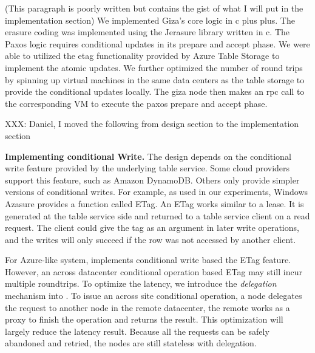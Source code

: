 (This paragraph is poorly written but contains the gist of what I will put in the implementation section)
We implemented Giza’s core logic in c plus plus. The erasure coding was implemented using the Jerasure library written in c. The Paxos logic requires conditional updates in its prepare and accept phase. We were able to utilized the etag functionality provided by Azure Table Storage to implement the atomic updates. We further optimized the number of round trips by spinning up virtual machines in the same data centers as the table storage to provide the conditional updates locally. The giza node then makes an rpc call to the corresponding VM to execute the paxos prepare and accept phase. 

{XXX: Daniel, I moved the following from design section to the implementation section}

{\bf Implementing conditional Write.}
The \name design depends on the conditional write feature provided by the
underlying table service. Some cloud providers support this feature, such as Amazon DynamoDB.
Others only provide simpler versions of conditional writes. For example, as used in our
experiments, Windows Azasure provides a function called ETag. An ETag works similar to
a lease. It is generated at the table service side and returned to a table service client
on a read request. The client could give the tag as an argument in later write operations,
and the writes will only succeed if the row was not accessed by another client.

For Azure-like system, {\name} implements conditional write based the ETag feature.
However, an across datacenter conditional operation based ETag may still incur multiple
roundtrips. To optimize the latency, we introduce the \emph{delegation} mechanism
into {\name}. To issue an across site conditional operation, a {\name} node delegates the
request to another {\name} node in the remote datacenter, the remote {\name} works as
a proxy to finish the operation and returns the result. This optimization will largely
reduce the latency result. Because all the requests can be safely abandoned and retried,
the {\name} nodes are still stateless with delegation.

